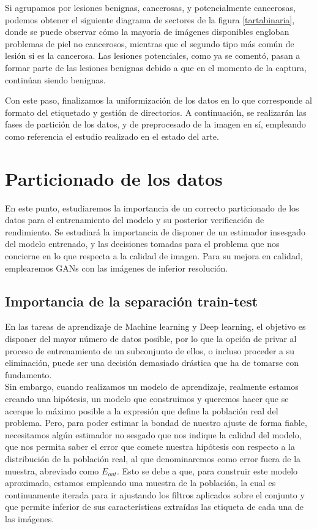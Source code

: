 Si agrupamos por lesiones benignas, cancerosas, y potencialmente cancerosas, podemos obtener el siguiente diagrama de sectores de la figura \ref{tartabinaria}, donde se puede observar cómo la mayoría de imágenes disponibles engloban problemas de piel no cancerosos, mientras que el segundo tipo más común de lesión si es la cancerosa. Las lesiones potenciales, como ya se comentó, pasan a formar parte de las lesiones benignas debido a que en el momento de la captura, continúan siendo benignas.

Con este paso, finalizamos la uniformización de los datos en lo que corresponde al formato del etiquetado y gestión de directorios. A continuación, se realizarán las fases de partición de los datos, y de preprocesado de la imagen en sí, empleando como referencia el estudio realizado en el estado del arte.


\section{Particionado de los datos}

En este punto, estudiaremos la importancia de un correcto particionado de los datos para el entrenamiento del modelo y su posterior verificación de rendimiento. Se estudiará la importancia de disponer de un estimador insesgado del modelo entrenado, y las decisiones tomadas para el problema que nos concierne en lo que respecta a la calidad de imagen. Para su mejora en calidad, emplearemos GANs con las imágenes de inferior resolución.

\subsection{Importancia de la separación train-test}
En las tareas de aprendizaje de Machine learning y Deep learning, el objetivo es disponer del mayor número de datos posible, por lo que la opción de privar al proceso de entrenamiento de un subconjunto de ellos, o incluso proceder a su eliminación, puede ser una decisión demasiado drástica que ha de tomarse con fundamento.\\

Sin embargo, cuando realizamos un modelo de aprendizaje, realmente estamos creando una hipótesis, un modelo que construimos y queremos hacer que se acerque lo máximo posible a la expresión que define la población real del problema. Pero, para poder estimar la bondad de nuestro ajuste de forma fiable, necesitamos algún estimador no sesgado que nos indique la calidad del modelo, que nos permita saber el error que comete nuestra hipótesis con respecto a la distribución de la población real, al que denominaremos como error fuera de la muestra, abreviado como $E_{out}$.  Esto se debe a que, para construir este modelo aproximado, estamos empleando una muestra de la población, la cual es continuamente iterada para ir ajustando los filtros aplicados sobre el conjunto y que permite inferior de sus características extraídas las etiqueta de cada una de las imágenes.\\

